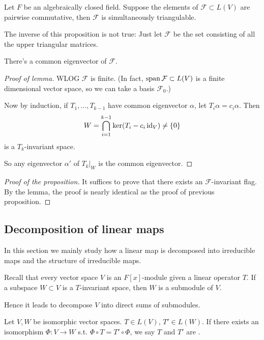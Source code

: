 \begin{proposition}
	Let $F$ be an algebraically closed field.
	Suppose the elements of $\mathcal{F}\subset L(V)$ are pairwise commutative,
	then $\mathcal{F}$ is simultaneously triangulable.
\end{proposition}
\begin{remark}
    The inverse of this proposition is not true:
	Just let $\mathcal{F}$ be the set consisting of all the
	upper triangular matrices.
\end{remark}
\begin{lemma}
	There's a common eigenvector of $\mathcal{F}$.
\end{lemma}
\begin{proof}[Proof of lemma]
    WLOG $\mathcal{F}$ is finite.
	(In fact, $\operatorname{span} \mathcal{F} \subset L(V)$ is a finite dimensional vector space,
	so we can take a basis $\mathcal{F}_0$.)

	Now by induction, if $T_1,\dots, T_{k-1}$ have common eigenvector $\alpha$,
	let $T_i\alpha = c_i \alpha$.
	Then
	\[
	W = \bigcap_{i=1}^{k-1} \ker(T_i - c_i \operatorname{id}_V) \ne \{0\}
	\]
	is a $T_k$-invariant space.

	So any eigenvector $\alpha'$ of $T_k\big|_W$ is the common eigenvector.
\end{proof}
\begin{proof}[Proof of the proposition]
    It suffices to prove that there exists an $\mathcal{F}$-invariant flag.
	By the lemma, the proof is nearly identical as the proof
	of previous proposition.
\end{proof}

\subsection{Decomposition of linear maps}
\label{sub:Decomposition of linear maps}

In this section we mainly study how a linear map is decomposed into
irreducible maps and the structure of irreducible maps.

Recall that every vector space $V$ is an $F[x]$-module given a linear operator $T$.
If a subspace $W \subset V$ is a $T$-invariant space,
then $W$ is a submodule of $V$.

Hence it leads to decompose $V$ into direct sums of submodules.

\begin{definition}
	Let $V, W$ be isomorphic vector spaces.
	$T\in L(V)$, $T'\in L(W)$.
	If there exists an isomorphism $\Phi: V\to W$ s.t.
	$\Phi \circ T = T'\circ \Phi$,
	we say $T$ and $T'$ are .
\end{definition}

